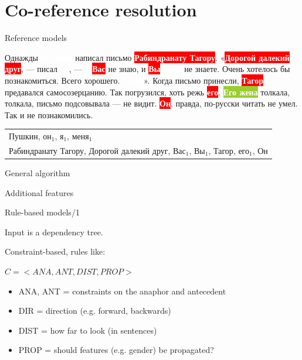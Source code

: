 \documentclass[dvipsnames, 10pt, compress]{beamer}
\newcommand{\redfillbox}[1]{\colorbox{red}{\textcolor{white}{{\bf #1}}}}
\newcommand{\bluefillbox}[1]{\colorbox{ProcessBlue}{\textcolor{white}{{\bf #1}}}}
\newcommand{\greenfillbox}[1]{\colorbox{YellowGreen}{\textcolor{white}{{\bf #1}}}}
\begin{document}
\section{Co-reference resolution}


\begin{frame}


\end{frame}


\begin{frame}{Reference models}


Однажды \bluefillbox{Пушкин} написал письмо \redfillbox{Рабиндранату Тагору}. 
«\redfillbox{Дорогой далекий друг}, — писал \bluefillbox{он}, — \bluefillbox{я} \redfillbox{Вас} не знаю, и \redfillbox{Вы} \bluefillbox{меня} не знаете.
Очень хотелось бы познакомиться. Всего хорошего. \bluefillbox{Саша}».
Когда письмо принесли, \redfillbox{Тагор} предавался самосозерцанию. 
Так погрузился, хоть режь \redfillbox{его}. 
\greenfillbox{Его жена} толкала, толкала, письмо подсовывала — не видит. 
\redfillbox{Он}, правда, по-русски читать не умел. Так и не познакомились.

\begin{tabular}{l}
{ Пушкин, он$_1$, я$_1$, меня$_1$ } \\ 
{ Рабиндранату Тагору, Дорогой далекий друг, Вас$_1$, Вы$_1$, Тагор, его$_1$, Он} \\
\end{tabular}

\end{frame}

\begin{frame}{General algorithm}

\end{frame}


\begin{frame}{Additional features}

\end{frame}


\begin{frame}{Rule-based models/1} %

Input is a dependency tree.

Constraint-based, rules like:

$C = <ANA,  ANT, DIST, PROP>$

\begin{itemize}
  \item ANA, ANT = constraints on the anaphor and antecedent
  \item DIR = direction (e.g. forward, backwards)
  \item DIST = how far to look (in sentences)
  \item PROP = should features (e.g. gender) be propagated?
\end{itemize}

\end{frame}
\end{document}

